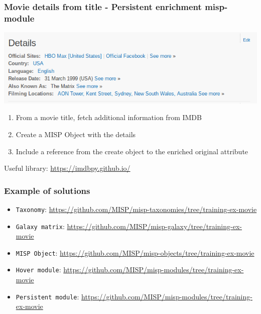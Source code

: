 \begin{frame}
    \frametitle{Movie details from title - Persistent enrichment misp-module}
    \begin{center}
        \includegraphics[width=0.85\linewidth]{pics/movie-details2}
    \end{center}
    \begin{enumerate}
        \item From a movie title, fetch additional information from IMDB
        \item Create a MISP Object with the details
        \item Include a reference from the create object to the enriched original attribute
    \end{enumerate}
    \vspace{1em}
    Useful library: \url{https://imdbpy.github.io/}
\end{frame}

\begin{frame}
    \frametitle{Example of solutions}
    \begin{itemize}
        \item \texttt{Taxonomy}: {\tiny \url{https://github.com/MISP/misp-taxonomies/tree/training-ex-movie}}
        \item \texttt{Galaxy matrix}: {\tiny \url{https://github.com/MISP/misp-galaxy/tree/training-ex-movie}}
        \item \texttt{MISP Object}: {\tiny \url{https://github.com/MISP/misp-objects/tree/training-ex-movie}}
        \item \texttt{Hover module}: {\tiny \url{https://github.com/MISP/misp-modules/tree/training-ex-movie}}
        \item \texttt{Persistent module}: {\tiny \url{https://github.com/MISP/misp-modules/tree/training-ex-movie}}
    \end{itemize}
\end{frame}
